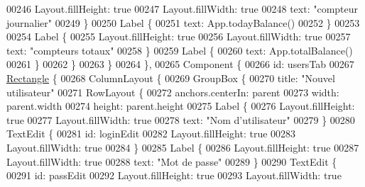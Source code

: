 \begin{DoxyCode}
00246                         Layout.fillHeight: \textcolor{keyword}{true}
00247                         Layout.fillWidth: \textcolor{keyword}{true}
00248                         text: \textcolor{stringliteral}{"compteur journalier"}
00249                     \}
00250                     Label \{
00251                         text: App.todayBalance()
00252                     \}
00253 
00254                     Label \{
00255                         Layout.fillHeight: \textcolor{keyword}{true}
00256                         Layout.fillWidth: \textcolor{keyword}{true}
00257                         text: \textcolor{stringliteral}{"compteurs totaux"}
00258                     \}
00259                     Label \{
00260                         text: App.totalBalance()
00261                     \}
00262                 \}
00263             \}
00264         \},
00265         Component \{
00266             \textcolor{keywordtype}{id}: usersTab
00267             \hyperlink{classRectangle}{Rectangle} \{
00268                 ColumnLayout \{
00269                     GroupBox \{
00270                         title: \textcolor{stringliteral}{"Nouvel utilisateur"}
00271                         RowLayout \{
00272                             anchors.centerIn: parent
00273                             width: parent.width
00274                             height: parent.height
00275                             Label \{
00276                                 Layout.fillHeight: \textcolor{keyword}{true}
00277                                 Layout.fillWidth: \textcolor{keyword}{true}
00278                                 text: \textcolor{stringliteral}{"Nom d'utilisateur"}
00279                             \}
00280                             TextEdit \{
00281                                 \textcolor{keywordtype}{id}: loginEdit
00282                                 Layout.fillHeight: \textcolor{keyword}{true}
00283                                 Layout.fillWidth: \textcolor{keyword}{true}
00284                             \}
00285                             Label \{
00286                                 Layout.fillHeight: \textcolor{keyword}{true}
00287                                 Layout.fillWidth: \textcolor{keyword}{true}
00288                                 text: \textcolor{stringliteral}{"Mot de passe"}
00289                             \}
00290                             TextEdit \{
00291                                 \textcolor{keywordtype}{id}: passEdit
00292                                 Layout.fillHeight: \textcolor{keyword}{true}
00293                                 Layout.fillWidth: \textcolor{keyword}{true}

\end{DoxyCode}
